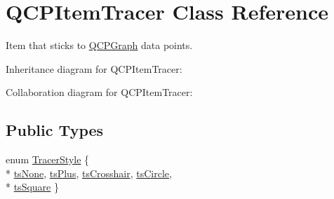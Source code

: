 \hypertarget{classQCPItemTracer}{}\section{Q\+C\+P\+Item\+Tracer Class Reference}
\label{classQCPItemTracer}


Item that sticks to \hyperlink{classQCPGraph}{Q\+C\+P\+Graph} data points.  




Inheritance diagram for Q\+C\+P\+Item\+Tracer\+:


Collaboration diagram for Q\+C\+P\+Item\+Tracer\+:
\subsection*{Public Types}
\begin{DoxyCompactItemize}
\item 
enum \hyperlink{classQCPItemTracer_a2f05ddb13978036f902ca3ab47076500}{Tracer\+Style} \{ \\*
\hyperlink{classQCPItemTracer_a2f05ddb13978036f902ca3ab47076500aac27462c79146225bfa8fba24d2ee8a4}{ts\+None}, 
\hyperlink{classQCPItemTracer_a2f05ddb13978036f902ca3ab47076500a3323fb04017146e4885e080a459472fa}{ts\+Plus}, 
\hyperlink{classQCPItemTracer_a2f05ddb13978036f902ca3ab47076500af562ec81ac3ba99e26ef8540cf1ec16f}{ts\+Crosshair}, 
\hyperlink{classQCPItemTracer_a2f05ddb13978036f902ca3ab47076500ae2252c28f4842880d71e9f94e69de94e}{ts\+Circle}, 
\\*
\hyperlink{classQCPItemTracer_a2f05ddb13978036f902ca3ab47076500a4ed5f01f2c5fd86d980366d79f481b9b}{ts\+Square}
 \}
\end{DoxyCompactItemize}
